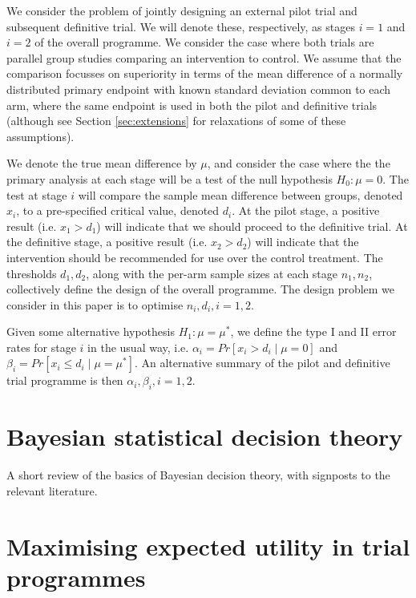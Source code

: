 \documentclass[sagev, Crown]{sagej}
\begin{document}
We consider the problem of jointly designing an external pilot trial and subsequent definitive trial. We will denote these, respectively, as stages $i=1$ and $i=2$ of the overall programme. We consider the case where both trials are parallel group studies comparing an intervention to control. We assume that the comparison focusses on superiority in terms of the mean difference of a normally distributed primary endpoint with known standard deviation common to each arm, where the same endpoint is used in both the pilot and definitive trials (although see Section \ref{sec:extensions} for relaxations of some of these assumptions). 

We denote the true mean difference by $\mu$, and consider the case where the the primary analysis at each stage will be a test of the null hypothesis $H_0: \mu = 0$. The test at stage $i$ will compare the sample mean difference between groups, denoted  $x_i$, to a pre-specified critical value, denoted $d_i$. At the pilot stage, a positive result (i.e. $x_1 > d_1$) will indicate that we should proceed to the definitive trial. At the definitive stage, a positive result (i.e. $x_2 > d_2$) will indicate that the intervention should be recommended for use over the control treatment. The thresholds $d_1, d_2$, along with the per-arm sample sizes at each stage $n_1, n_2$, collectively define the design of the overall programme. The design problem we consider in this paper is to optimise $n_i, d_i, i = 1,2$.

Given some alternative hypothesis $H_1: \mu =\mu^*$, we define the type I and II error rates for stage $i$ in the usual way, i.e. $\alpha_i = Pr[x_i > d_i \mid \mu = 0]$ and $\beta_i = Pr[x_i \leq d_i \mid \mu = \mu^*]$. An alternative summary of the pilot and definitive trial programme is then  $\alpha_i, \beta_i, i=1,2$.


\section{Bayesian statistical decision theory}\label{sec:bsdt}

A short review of the basics of Bayesian decision theory, with signposts to the relevant literature.

\section{Maximising expected utility in trial programmes}\label{sec:methods}
\end{document}
